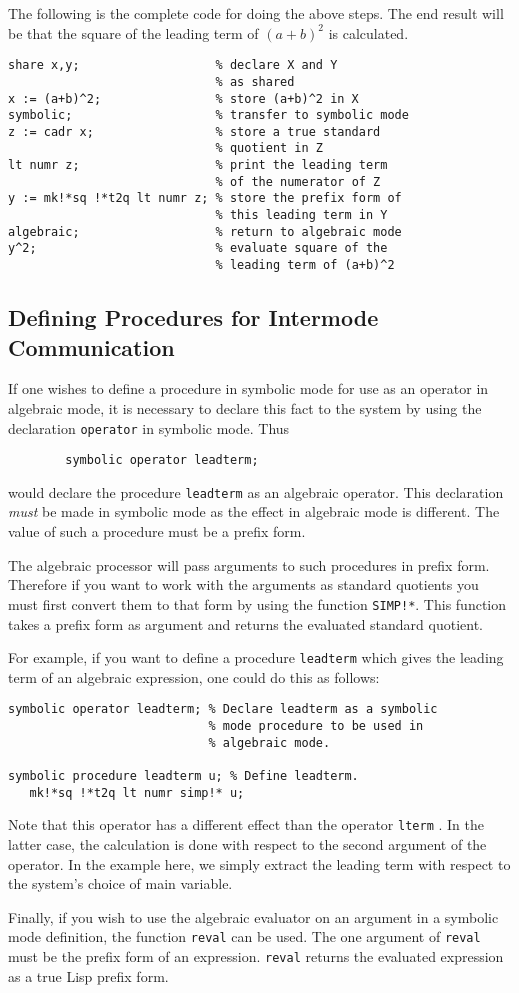The following is the complete code for doing the above steps. The end
result will be that the square of the leading term of $(a+b)^{2}$ is
calculated.

\begin{verbatim}
share x,y;                   % declare X and Y
                             % as shared
x := (a+b)^2;                % store (a+b)^2 in X
symbolic;                    % transfer to symbolic mode
z := cadr x;                 % store a true standard
                             % quotient in Z
lt numr z;                   % print the leading term
                             % of the numerator of Z
y := mk!*sq !*t2q lt numr z; % store the prefix form of
                             % this leading term in Y
algebraic;                   % return to algebraic mode
y^2;                         % evaluate square of the
                             % leading term of (a+b)^2
\end{verbatim}

\subsection{Defining Procedures for Intermode Communication}

If one wishes to define a procedure in symbolic mode for use as an
operator in algebraic mode, it is necessary to declare this fact to the
system by using the declaration \texttt{operator} in
symbolic mode. Thus
\begin{verbatim}
        symbolic operator leadterm;
\end{verbatim}
would declare the procedure \texttt{leadterm} as an algebraic operator. This
declaration \emph{must} be made in symbolic mode as the effect in algebraic
mode is different.  The value of such a procedure must be a prefix form.

The algebraic processor will pass arguments to such procedures in prefix
form. Therefore if you want to work with the arguments as standard
quotients you must first convert them to that form by using the function
\texttt{SIMP!*}. This function takes a prefix form as argument and returns the
evaluated standard quotient.

For example, if you want to define a procedure \texttt{leadterm} which gives the
leading term of an algebraic expression, one could do this as follows:
\begin{samepage}
\begin{verbatim}
symbolic operator leadterm; % Declare leadterm as a symbolic
                            % mode procedure to be used in
                            % algebraic mode.

symbolic procedure leadterm u; % Define leadterm.
   mk!*sq !*t2q lt numr simp!* u;
\end{verbatim}
\end{samepage}
Note that this operator has a different effect than the operator \texttt{lterm}
.  In the latter case, the calculation is done
with respect to the second argument of the operator.  In the example here,
we simply extract the leading term with respect to the system's choice of
main variable.

Finally, if you wish to use the algebraic evaluator on an argument in a
symbolic mode definition, the function \texttt{reval} can be used.  The one
argument of \texttt{reval} must be the prefix form of an expression.
\texttt{reval} returns the evaluated expression as a true Lisp prefix form.
